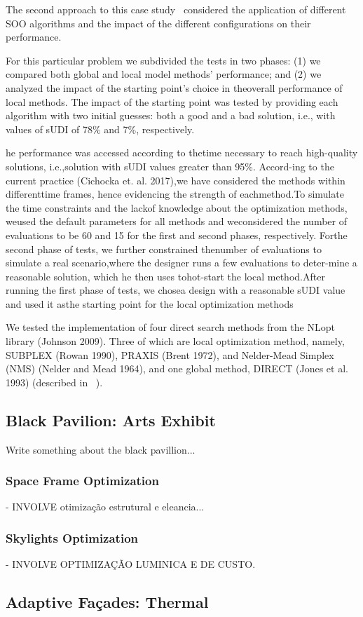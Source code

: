 The second approach to this case study~\cite{Belem2018optimizeddesign} considered the application of different \ac{SOO} algorithms and the impact of the different configurations on their performance.


For this particular problem we subdivided the tests in two phases: (1) we compared both global and local model methods’ performance; and (2) we analyzed the impact of the starting point’s choice in theoverall performance of local methods. The impact of the starting point was tested by providing each algorithm with two initial guesses: both a good and a bad solution, i.e., with values of sUDI of 78\% and 7\%, respectively. 


he performance was accessed according to thetime necessary to reach high-quality solutions, i.e.,solution with sUDI values greater than 95\%. Accord-ing to the current practice (Cichocka et.  al.  2017),we have considered the methods within differenttime frames, hence evidencing the strength of eachmethod.To simulate the time constraints and the lackof knowledge about the optimization methods, weused the default parameters for all methods and weconsidered the number of evaluations to be 60 and 15 for the first and second phases, respectively. Forthe second phase of tests, we further constrained thenumber of evaluations to simulate a real scenario,where the designer runs a few evaluations to deter-mine a reasonable solution, which he then uses tohot-start the local method.After running the first phase of tests, we chosea design with a reasonable sUDI value and used it asthe starting point for the local optimization methods

We tested the implementation of four direct search methods from the NLopt library (Johnson 2009). Three of which are local optimization method, namely, SUBPLEX (Rowan 1990), PRAXIS (Brent 1972), and Nelder-Mead Simplex (NMS) (Nelder and Mead 1964), and one global method, DIRECT (Jones et al. 1993) (described in ~).


\subsection{Black Pavilion: Arts Exhibit}

Write something about the black pavillion...

\subsubsection{Space Frame Optimization}

- INVOLVE otimização estrutural e eleancia...

\subsubsection{Skylights Optimization}

- INVOLVE OPTIMIZAÇÃO LUMINICA E DE CUSTO.


\subsection{Adaptive Façades: Thermal}
